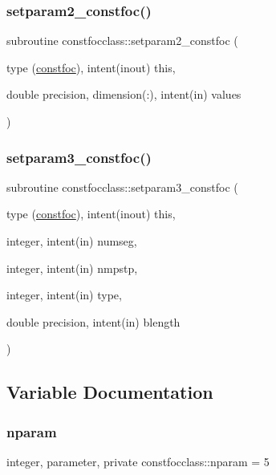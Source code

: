 \mbox{\label{namespaceconstfocclass_a36ac221c9fb8e90f23b97b10cc272775}} 
\subsubsection{\texorpdfstring{setparam2\_constfoc()}{setparam2\_constfoc()}}
{\footnotesize\ttfamily subroutine constfocclass\+::setparam2\+\_\+constfoc (\begin{DoxyParamCaption}\item[{type (\mbox{\hyperlink{namespaceconstfocclass_structconstfocclass_1_1constfoc}{constfoc}}), intent(inout)}]{this,  }\item[{double precision, dimension(\+:), intent(in)}]{values }\end{DoxyParamCaption})}

\mbox{\label{namespaceconstfocclass_a9d02ddbf03689cdd653805ca5a56856e}} 
\subsubsection{\texorpdfstring{setparam3\_constfoc()}{setparam3\_constfoc()}}
{\footnotesize\ttfamily subroutine constfocclass\+::setparam3\+\_\+constfoc (\begin{DoxyParamCaption}\item[{type (\mbox{\hyperlink{namespaceconstfocclass_structconstfocclass_1_1constfoc}{constfoc}}), intent(inout)}]{this,  }\item[{integer, intent(in)}]{numseg,  }\item[{integer, intent(in)}]{nmpstp,  }\item[{integer, intent(in)}]{type,  }\item[{double precision, intent(in)}]{blength }\end{DoxyParamCaption})}



\subsection{Variable Documentation}
\mbox{\label{namespaceconstfocclass_a4a04b85ebc26340b40e7c38cfad62bc1}} 
\subsubsection{\texorpdfstring{nparam}{nparam}}
{\footnotesize\ttfamily integer, parameter, private constfocclass\+::nparam = 5\hspace{0.3cm}{\ttfamily [private]}}

